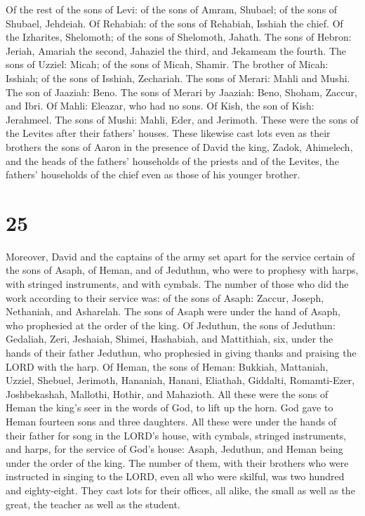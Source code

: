  Of the rest of the sons of Levi: of the sons of Amram,
Shubael; of the sons of Shubael, Jehdeiah.  Of Rehabiah:
of the sons of Rehabiah, Isshiah the chief.  Of the
Izharites, Shelomoth; of the sons of Shelomoth, Jahath. 
The sons of Hebron: Jeriah, Amariah the second, Jahaziel the third, and
Jekameam the fourth.  The sons of Uzziel: Micah; of the
sons of Micah, Shamir.  The brother of Micah: Isshiah; of
the sons of Isshiah, Zechariah.  The sons of Merari:
Mahli and Mushi. The son of Jaaziah: Beno.  The sons of
Merari by Jaaziah: Beno, Shoham, Zaccur, and Ibri.  Of
Mahli: Eleazar, who had no sons.  Of Kish, the son of
Kish: Jerahmeel.  The sons of Mushi: Mahli, Eder, and
Jerimoth. These were the sons of the Levites after their fathers'
houses.  These likewise cast lots even as their brothers
the sons of Aaron in the presence of David the king, Zadok, Ahimelech,
and the heads of the fathers' households of the priests and of the
Levites, the fathers' households of the chief even as those of his
younger brother.

\hypertarget{section-24}{%
\section{25}\label{section-24}}

 Moreover, David and the captains of the army set apart
for the service certain of the sons of Asaph, of Heman, and of Jeduthun,
who were to prophesy with harps, with stringed instruments, and with
cymbals. The number of those who did the work according to their service
was:  of the sons of Asaph: Zaccur, Joseph, Nethaniah, and
Asharelah. The sons of Asaph were under the hand of Asaph, who
prophesied at the order of the king.  Of Jeduthun, the
sons of Jeduthun: Gedaliah, Zeri, Jeshaiah, Shimei, Hashabiah, and
Mattithiah, six, under the hands of their father Jeduthun, who
prophesied in giving thanks and praising the LORD with the harp.
 Of Heman, the sons of Heman: Bukkiah, Mattaniah, Uzziel,
Shebuel, Jerimoth, Hananiah, Hanani, Eliathah, Giddalti, Romamti-Ezer,
Joshbekashah, Mallothi, Hothir, and Mahazioth.  All these
were the sons of Heman the king's seer in the words of God, to lift up
the horn. God gave to Heman fourteen sons and three daughters.
 All these were under the hands of their father for song
in the LORD's house, with cymbals, stringed instruments, and harps, for
the service of God's house: Asaph, Jeduthun, and Heman being under the
order of the king.  The number of them, with their
brothers who were instructed in singing to the LORD, even all who were
skilful, was two hundred and eighty-eight.  They cast lots
for their offices, all alike, the small as well as the great, the
teacher as well as the student.

